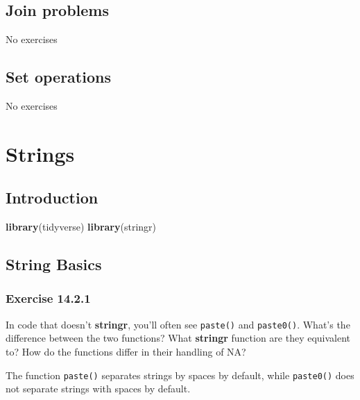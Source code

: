 \documentclass[]{book}
\newenvironment{Shaded}{\begin{snugshade}}{\end{snugshade}}
\newcommand{\KeywordTok}[1]{\textcolor[rgb]{0.13,0.29,0.53}{\textbf{#1}}}
\newcommand{\NormalTok}[1]{#1}
\theoremstyle{plain}
\theoremstyle{remark}
\begin{document}
\hypertarget{join-problems}{%
\section{Join problems}\label{join-problems}}

No exercises

\hypertarget{set-operations}{%
\section{Set operations}\label{set-operations}}

No exercises

\hypertarget{strings}{%
\chapter{Strings}\label{strings}}

\hypertarget{introduction-9}{%
\section{Introduction}\label{introduction-9}}

\begin{Shaded}
\begin{Highlighting}[]
\KeywordTok{library}\NormalTok{(tidyverse)}
\KeywordTok{library}\NormalTok{(stringr)}
\end{Highlighting}
\end{Shaded}

\hypertarget{string-basics}{%
\section{String Basics}\label{string-basics}}

\hypertarget{exercise-14.2.1}{%
\subsection*{\texorpdfstring{Exercise
{14.2.1}}{Exercise 14.2.1}}\label{exercise-14.2.1}}

In code that doesn't \textbf{stringr}, you'll often see \texttt{paste()}
and \texttt{paste0()}. What's the difference between the two functions?
What \textbf{stringr} function are they equivalent to? How do the
functions differ in their handling of NA?

The function \texttt{paste()} separates strings by spaces by default,
while \texttt{paste0()} does not separate strings with spaces by
default.
\end{document}
